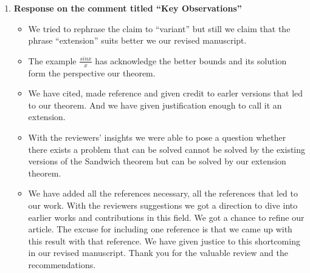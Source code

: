 \documentclass[a4paper,twoside,12pt]{article}
\begin{document}
\begin{enumerate}
\item \textbf{Response on the comment titled ``Key Observations'' } \\[2mm]
  \begin{itemize}
  \item We tried to rephrase the claim to ``variant'' but still we claim that the phrase ``extension'' suits better we our revised manuscript.

  \item The example $\frac{sinx}{x}$ has acknowledge the better bounds and its solution form the perspective our theorem.

  \item We have cited, made reference and given credit to earler versions that led to our theorem. And we have given justification enough to call it an extension.

  \item With the reviewers' insights we were able to pose a question whether there exists a problem that can be solved cannot be solved by the existing versions of the Sandwich theorem but can be solved by our extension theorem.

  \item We have added all the references necessary, all the references that led to our work. With the reviewers suggestions we got a direction to dive into earlier works and contributions in this field. We got a chance to refine our article. The excuse for including one reference is that we came up with this result with that reference. We have given justice to this shortcoming in our revised manuscript. Thank you for the valuable review and the recommendations.
  \end{itemize}

\end{enumerate}
\end{document}
